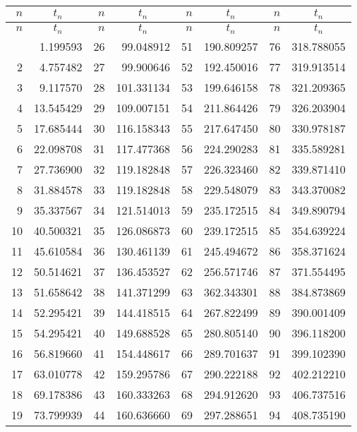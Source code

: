 \medskip
{\noindent 
\addtolength{\tabcolsep}{-3pt}
\begin{longtable}{|rr|rr|rr|rr|}
  \hline
  $n$ & \multicolumn{1}{c|}{$t_n$} & $n$ & \multicolumn{1}{c|}{$t_n$} &
  $n$ & \multicolumn{1}{c|}{$t_n$} & $n$ & \multicolumn{1}{c|}{$t_n$}\\
  \hline
\endfirsthead
\hline
  $n$ & \multicolumn{1}{c|}{$t_n$} & $n$ & \multicolumn{1}{c|}{$t_n$} &
  $n$ & \multicolumn{1}{c|}{$t_n$} & $n$ & \multicolumn{1}{c|}{$t_n$}\\
  \hline
\endhead
\hline
\endfoot
\endlastfoot
  1 & 1.199593 & 26 & 99.048912 & 51 & 190.809257 & 76& 318.788055\\
  2 & 4.757482 & 27 & 99.900646 & 52 & 192.450016 & 77& 319.913514\\
  3 & 9.117570 & 28 & 101.331134 & 53 & 199.646158 & 78 & 321.209365
  \\
  4 & 13.545429 & 29 &109.007151 & 54& 211.864426& 79& 326.203904\\
  5 & 17.685444 & 30 &116.158343 & 55 &217.647450 &80 &330.978187 \\
  6 & 22.098708 & 31 & 117.477368 & 56 & 224.290283 & 81 & 335.589281\\
  7 & 27.736900 & 32 & 119.182848& 57& 226.323460& 82&339.871410\\
  8 & 31.884578 & 33 & 119.182848& 58& 229.548079& 83&343.370082 \\
  9 & 35.337567 & 34 & 121.514013& 59& 235.172515& 84& 349.890794\\
  10 & 40.500321& 35 & 126.086873& 60& 239.172515 &85 & 354.639224 \\
  11& 45.610584 & 36 & 130.461139& 61& 245.494672& 86& 358.371624\\
  12& 50.514621 & 37 & 136.453527& 62& 256.571746& 87 & 371.554495\\
  13& 51.658642 & 38 & 141.371299 & 63& 362.343301 & 88 & 384.873869 \\
  14& 52.295421 & 39 & 144.418515& 64& 267.822499& 89& 390.001409\\
  15& 54.295421 & 40 & 149.688528 & 65& 280.805140& 90 & 396.118200 \\
  16& 56.819660 & 41 & 154.448617 & 66& 289.701637& 91&399.102390 \\
  17& 63.010778 & 42 & 159.295786& 67& 290.222188& 92& 402.212210 \\
  18& 69.178386 & 43 & 160.333263 &68 &294.912620 &93 &406.737516 \\
  19& 73.799939 & 44 & 160.636660 &69 &297.288651 &94 &408.735190 \\

\end{longtable}}
